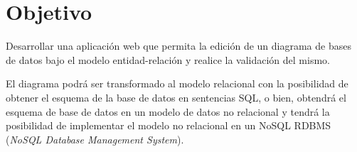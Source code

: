 \section{Objetivo}
Desarrollar una aplicación web que permita la edición de un diagrama de bases de datos bajo el modelo entidad-relación y realice la validación del mismo.


El diagrama podrá ser transformado al modelo relacional con la posibilidad de obtener el esquema de la base de datos en sentencias SQL, o bien, obtendrá el esquema de base de datos en un modelo de datos no relacional y tendrá la posibilidad de implementar el modelo no relacional en un NoSQL RDBMS (\textit{NoSQL Database Management System}).

